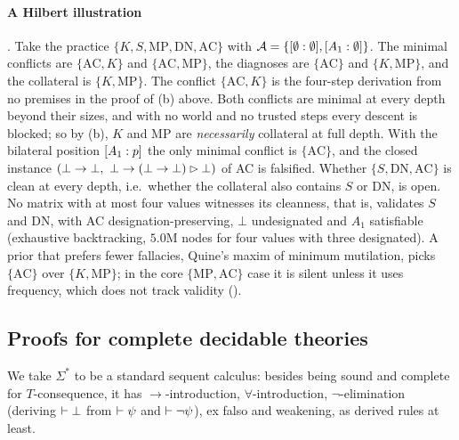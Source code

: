 \paragraph{A Hilbert illustration} . Take the practice $\{K,S,\mathrm{MP},\mathrm{DN},\mathrm{AC}\}$ with $\mathcal{A}=\{[\emptyset : \emptyset],[A_1 : \emptyset]\}$. The minimal conflicts are $\{\mathrm{AC},K\}$ and $\{\mathrm{AC},\mathrm{MP}\}$, the diagnoses are $\{\mathrm{AC}\}$ and $\{K,\mathrm{MP}\}$, and the collateral is $\{K,\mathrm{MP}\}$. The conflict $\{\mathrm{AC},K\}$ is the four-step derivation from no premises in the proof of (b) above. Both conflicts are minimal at every depth beyond their sizes, and with no world and no trusted steps every descent is blocked; so by (b), $K$ and MP are \emph{necessarily} collateral at full depth. With the bilateral position $[A_1 : p]$ the only minimal conflict is $\{\mathrm{AC}\}$, and the closed instance $(\bot\to\bot,\ \bot\to(\bot\to\bot)\step\bot)$ of AC is falsified. Whether $\{S,\mathrm{DN},\mathrm{AC}\}$ is clean at every depth, i.e.\ whether the collateral also contains $S$ or DN, is open. No matrix with at most four values witnesses its cleanness, that is, validates $S$ and DN, with AC designation-preserving, $\bot$ undesignated and $A_1$ satisfiable (exhaustive backtracking, $5.0$M nodes for four values with three designated). A prior that prefers fewer fallacies, Quine's maxim of minimum mutilation, picks $\{\mathrm{AC}\}$ over $\{K,\mathrm{MP}\}$; in the core $\{\mathrm{MP},\mathrm{AC}\}$ case it is silent unless it uses frequency, which does not track validity ().

\subsection{Proofs for complete decidable theories}\label{app:twotier:decidable}

We take $\Sigma^*$ to be a standard sequent calculus: besides being sound and complete for $T$-consequence, it has $\to$-introduction, $\forall$-introduction, $\neg$-elimination (deriving $\vdash\bot$ from $\vdash\psi$ and $\vdash\neg\psi$), ex falso and weakening, as derived rules at least.

